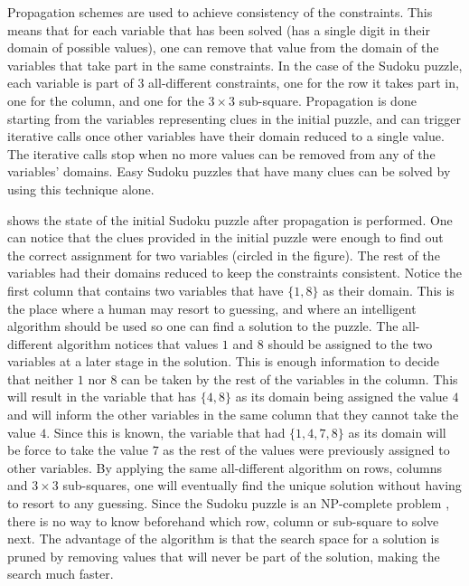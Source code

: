 \documentclass{l4proj}
\begin{document}
\noindent Propagation schemes are used to achieve consistency of the constraints. This means that for each variable that has been solved (has a single digit in their domain of possible values), one can remove that value from the domain of the variables that take part in the same constraints. In the case of the Sudoku puzzle, each variable is part of $3$ all-different constraints, one for the row it takes part in, one for the column, and one for the $3\times 3$ sub-square. Propagation is done starting from the variables representing clues in the initial puzzle, and can trigger iterative calls once other variables have their domain reduced to a single value. The iterative calls stop when no more values can be removed from any of the variables' domains. Easy Sudoku puzzles that have many clues \cite{gomes2002completing} can be solved by using this technique alone.

\noindent {} shows the state of the initial Sudoku puzzle after propagation is performed. One can notice that the clues provided in the initial puzzle were enough to find out the correct assignment for two variables (circled in the figure). The rest of the variables had their domains reduced to keep the constraints consistent. Notice the first column that contains two variables that have $\{1, 8\}$ as their domain. This is the place where a human may resort to guessing, and where an intelligent algorithm should be used so one can find a solution to the puzzle. The all-different algorithm notices that values $1$ and $8$ should be assigned to the two variables at a later stage in the solution. This is enough information to decide that neither $1$ nor $8$ can be taken by the rest of the variables in the column. This will result in the variable that has $\{4, 8\}$ as its domain being assigned the value $4$ and will inform the other variables in the same column that they cannot take the value $4$. Since this is known, the variable that had $\{1, 4, 7, 8\}$ as its domain will be force to take the value $7$ as the rest of the values were previously assigned to other variables. By applying the same all-different algorithm on rows, columns and $3\times 3$ sub-squares, one will eventually find the unique solution without having to resort to any guessing. Since the Sudoku puzzle is an NP-complete problem \cite{colbourn1984complexity}, there is no way to know beforehand which row, column or sub-square to solve next. The advantage of the algorithm is that the search space for a solution is pruned by removing values that will never be part of the solution, making the search much faster.
\end{document}
